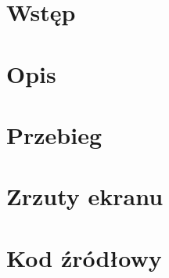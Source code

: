 

\newcommand{\temat}{Temat raportu}
\newcommand{\kurs}{Nazwa kursu}
\newcommand{\grupa}{Poniedziałek 9:15 TN}
\newcommand{\prowadzacy}{dr inż. Jan Nowak}
\newcommand{\autor}{Michał Dudek}
\newcommand{\indeks}{218383}





\mytitlepage

\tableofcontents
\vspace{3.5cm}

{\let\clearpage\relax \chapter{Wstęp}}

\chapter{Opis}

{\let\clearpage\relax \chapter{Przebieg}}

\chapter{Zrzuty ekranu}

\chapter{Kod źródłowy}

